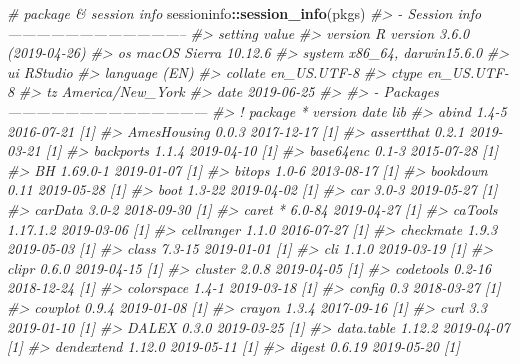 \documentclass[]{krantz}
\makeatletter
\newenvironment{Shaded}{\begin{snugshade}}{\end{snugshade}}
\newcommand{\CommentTok}[1]{\textcolor[rgb]{0.37,0.37,0.37}{\textit{#1}}}
\newcommand{\KeywordTok}[1]{\textcolor[rgb]{0.27,0.27,0.27}{\textbf{#1}}}
\newcommand{\NormalTok}[1]{#1}
\newcommand{\OperatorTok}[1]{\textcolor[rgb]{0.43,0.43,0.43}{\textbf{#1}}}
\newenvironment{kframe}{%
\medskip{}
\setlength{\fboxsep}{.8em}
 \def\at@end@of@kframe{}%
 \ifinner\ifhmode%
  \def\at@end@of@kframe{\end{minipage}}%
  \begin{minipage}{\columnwidth}%
 \fi\fi%
 \def\FrameCommand##1{\hskip\@totalleftmargin \hskip-\fboxsep
 \colorbox{shadecolor}{##1}\hskip-\fboxsep
     \hskip-\linewidth \hskip-\@totalleftmargin \hskip\columnwidth}%
 \MakeFramed {\advance\hsize-\width
   \@totalleftmargin\z@ \linewidth\hsize
   \@setminipage}}%
 {\par\unskip\endMakeFramed%
 \at@end@of@kframe}
\renewenvironment{Shaded}{\begin{kframe}}{\end{kframe}}
\makeatother
\begin{document}
\begin{Shaded}
\begin{Highlighting}[]
\CommentTok{# package & session info}
\NormalTok{sessioninfo}\OperatorTok{::}\KeywordTok{session_info}\NormalTok{(pkgs)}
\CommentTok{#> - Session info --------------------------------------}
\CommentTok{#>  setting  value                       }
\CommentTok{#>  version  R version 3.6.0 (2019-04-26)}
\CommentTok{#>  os       macOS Sierra 10.12.6        }
\CommentTok{#>  system   x86_64, darwin15.6.0        }
\CommentTok{#>  ui       RStudio                     }
\CommentTok{#>  language (EN)                        }
\CommentTok{#>  collate  en_US.UTF-8                 }
\CommentTok{#>  ctype    en_US.UTF-8                 }
\CommentTok{#>  tz       America/New_York            }
\CommentTok{#>  date     2019-06-25                  }
\CommentTok{#> }
\CommentTok{#> - Packages ------------------------------------------}
\CommentTok{#>  ! package       * version    date       lib}
\CommentTok{#>    abind           1.4-5      2016-07-21 [1]}
\CommentTok{#>    AmesHousing     0.0.3      2017-12-17 [1]}
\CommentTok{#>    assertthat      0.2.1      2019-03-21 [1]}
\CommentTok{#>    backports       1.1.4      2019-04-10 [1]}
\CommentTok{#>    base64enc       0.1-3      2015-07-28 [1]}
\CommentTok{#>    BH              1.69.0-1   2019-01-07 [1]}
\CommentTok{#>    bitops          1.0-6      2013-08-17 [1]}
\CommentTok{#>    bookdown        0.11       2019-05-28 [1]}
\CommentTok{#>    boot            1.3-22     2019-04-02 [1]}
\CommentTok{#>    car             3.0-3      2019-05-27 [1]}
\CommentTok{#>    carData         3.0-2      2018-09-30 [1]}
\CommentTok{#>    caret         * 6.0-84     2019-04-27 [1]}
\CommentTok{#>    caTools         1.17.1.2   2019-03-06 [1]}
\CommentTok{#>    cellranger      1.1.0      2016-07-27 [1]}
\CommentTok{#>    checkmate       1.9.3      2019-05-03 [1]}
\CommentTok{#>    class           7.3-15     2019-01-01 [1]}
\CommentTok{#>    cli             1.1.0      2019-03-19 [1]}
\CommentTok{#>    clipr           0.6.0      2019-04-15 [1]}
\CommentTok{#>    cluster         2.0.8      2019-04-05 [1]}
\CommentTok{#>    codetools       0.2-16     2018-12-24 [1]}
\CommentTok{#>    colorspace      1.4-1      2019-03-18 [1]}
\CommentTok{#>    config          0.3        2018-03-27 [1]}
\CommentTok{#>    cowplot         0.9.4      2019-01-08 [1]}
\CommentTok{#>    crayon          1.3.4      2017-09-16 [1]}
\CommentTok{#>    curl            3.3        2019-01-10 [1]}
\CommentTok{#>    DALEX           0.3.0      2019-03-25 [1]}
\CommentTok{#>    data.table      1.12.2     2019-04-07 [1]}
\CommentTok{#>    dendextend      1.12.0     2019-05-11 [1]}
\CommentTok{#>    digest          0.6.19     2019-05-20 [1]}

\end{Highlighting}
\end{Shaded}
\end{document}
